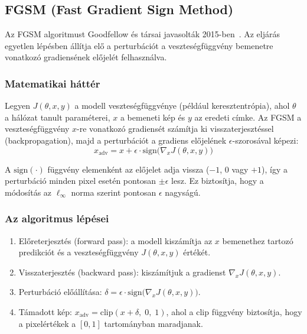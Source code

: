 \documentclass[12pt,a4paper]{article}
\begin{document}
\subsection{FGSM (Fast Gradient Sign Method)}

Az FGSM algoritmust Goodfellow és társai javasolták 2015-ben~\cite{goodfellow2015explaining}. Az eljárás
egyetlen lépésben állítja elő a perturbációt a veszteségfüggvény bemenetre vonatkozó gradiensének
előjelét felhasználva.

\subsubsection{Matematikai háttér}

Legyen $J(\theta, x, y)$ a modell veszteségfüggvénye (például keresztentrópia), ahol $\theta$ a hálózat
tanult paraméterei, $x$ a bemeneti kép és $y$ az eredeti címke. Az FGSM a veszteségfüggvény
$x$-re vonatkozó gradiensét számítja ki visszaterjesztéssel (backpropagation), majd a perturbációt
a gradiens előjelének $\epsilon$-szorosával képezi:
\[
  x_{\mathrm{adv}} = x + \epsilon \cdot \mathrm{sign}\bigl(\nabla_x J(\theta, x, y)\bigr)
\]

A $\mathrm{sign}(\cdot)$ függvény elemenként az előjelet adja vissza ($-1$, $0$ vagy $+1$), így a
perturbáció minden pixel esetén pontosan $\pm\epsilon$ lesz. Ez biztosítja, hogy a módosítás az
$\ell_\infty$ norma szerint pontosan $\epsilon$ nagyságú.

\subsubsection{Az algoritmus lépései}

\begin{enumerate}
  \item Előreterjesztés (forward pass): a modell kiszámítja az $x$ bemenethez tartozó predikciót és a
        veszteségfüggvény $J(\theta, x, y)$ értékét.
  \item Visszaterjesztés (backward pass): kiszámítjuk a gradienst $\nabla_x J(\theta, x, y)$.
  \item Perturbáció előállítása: $\delta = \epsilon \cdot \mathrm{sign}\bigl(\nabla_x J(\theta, x, y)\bigr)$.
  \item Támadott kép: $x_{\mathrm{adv}} = \mathrm{clip}(x + \delta,\; 0,\; 1)$, ahol a $\mathrm{clip}$
        függvény biztosítja, hogy a pixelértékek a $[0, 1]$ tartományban maradjanak.
\end{enumerate}
\end{document}
